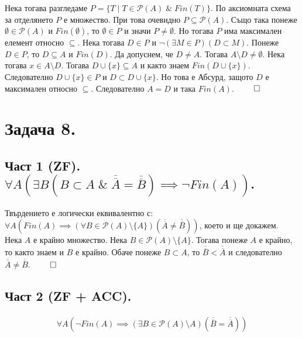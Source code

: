 \documentclass[12pt]{article}
\begin{document}
Нека тогава разгледаме \(P = \{T \; | \; T \in \mathcal{P}(A) \; \& \; Fin(T)\}\).
По аксиомната схема за отделянето \(P\) е множество.
При това очевидно \(P \subseteq \mathcal{P}(A)\).
Също така понеже \(\emptyset \in \mathcal{P}(A)\) и \(Fin(\emptyset)\),
то \(\emptyset \in P\) и значи \(P \neq \emptyset\).
Но тогава \(P\) има максимален елемент относно \(\subseteq\).
Нека тогава \(D \in P\) и \(\lnot(\exists M \in P)(D \subset M)\).
Понеже \(D \in P\), то \(D \subseteq A\) и \(Fin(D)\).
Да допуснем, че \(D \neq A\). Тогава \(A \setminus D \neq \emptyset\).
Нека тогава \(x \in A \setminus D\).
Тогава \(D \cup \{x\} \subseteq A\) и както знаем \(Fin(D \cup \{x\})\).
Следователно \(D \cup \{x\} \in P\) и \(D \subset D \cup \{x\}\).
Но това е Абсурд, защото \(D\) е максимален относно \(\subseteq\).
Следователно \(A = D\) и така \(Fin(A)\). \(\qed\)

\section*{Задача 8.}

\subsection*{Част 1 (ZF). \(\forall A (\exists B (B \subset A \; \& \; \overline{\overline{A}} = \overline{\overline{B}}) \implies \lnot Fin(A))\).}

Твърдението е логически еквивалентно с: \\
\(\forall A (Fin(A) \implies (\forall B \in \mathcal{P}(A) \setminus \{A\})(\overline{\overline{A}} \neq \overline{\overline{B}}))\), което и ще докажем. \\

Нека \(A\) е крайно множество. Нека \(B \in \mathcal{P}(A) \setminus \{A\}\).
Тогава понеже \(A\) е крайно, то както знаем и \(B\) е крайно.
Обаче понеже \(B \subset A\), то \(\overline{\overline{B}} < \overline{\overline{A}}\)
и следователно \(\overline{\overline{A}} \neq \overline{\overline{B}}\). \(\qed\)

\subsection*{Част 2 (ZF + ACC).}
\begin{align*}
    \forall A (\lnot Fin(A) \implies (\exists B \in \mathcal{P}(A) \setminus A)(\overline{\overline{B}} = \overline{\overline{A}}))
\end{align*}
\end{document}
